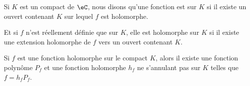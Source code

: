 \begin{definition}
    Si \( K\) est un compact de \( \eC\), nous disons qu'une fonction est  sur \( K\) si il existe un ouvert contenant \( K\) sur lequel \( f\) est holomorphe.

    Et si \( f\) n'est réellement définie que sur \( K\), elle est holomorphe sur \( K\) si il existe une extension holomorphe de \( f\) vers un ouvert contenant \( K\).
\end{definition}

\begin{lemma}
    Si \( f\) est une fonction holomorphe sur le compact \( K\), alors il existe une fonction polynôme \( P_f\) et une fonction holomorphe \( h_f \) ne s'annulant pas sur \( K\) telles que \( f=h_fP_f \).
\end{lemma}

